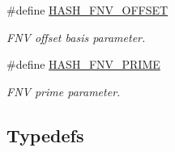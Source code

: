 \begin{CompactItemize}
\#define \hyperlink{group__dbprim__hash_ga49}{HASH\_\-FNV\_\-OFFSET}
\begin{CompactList}\small\item\em FNV offset basis parameter. \item\end{CompactList}\item 
\#define \hyperlink{group__dbprim__hash_ga50}{HASH\_\-FNV\_\-PRIME}
\begin{CompactList}\small\item\em FNV prime parameter. \item\end{CompactList}\end{CompactItemize}
\subsection*{Typedefs}

